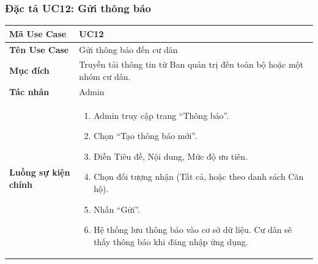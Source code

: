 \documentclass[12pt,a4paper]{article}
\begin{document}
\subsubsection{Đặc tả UC12: Gửi thông báo}
\begin{table}[H]
    \centering
    \renewcommand{\arraystretch}{1.2}
    \begin{tabularx}{\textwidth}{|l|X|}
    \hline
    \textbf{Mã Use Case} & \textbf{UC12} \\
    \hline
    \textbf{Tên Use Case} & Gửi thông báo đến cư dân \\
    \hline
    \textbf{Mục đích} & Truyền tải thông tin từ Ban quản trị đến toàn bộ hoặc một nhóm cư dân. \\
    \hline
    \textbf{Tác nhân} & Admin \\
    \hline
    \textbf{Luồng sự kiện chính} &
    \begin{enumerate}
        \item Admin truy cập trang ``Thông báo''.
        \item Chọn ``Tạo thông báo mới''.
        \item Điền Tiêu đề, Nội dung, Mức độ ưu tiên.
        \item Chọn đối tượng nhận (Tất cả, hoặc theo danh sách Căn hộ).
        \item Nhấn ``Gửi''.
        \item Hệ thống lưu thông báo vào cơ sở dữ liệu. Cư dân sẽ thấy thông báo khi đăng nhập ứng dụng.
    \end{enumerate} \\
    \hline
    \end{tabularx}
\end{table}

\end{document}
